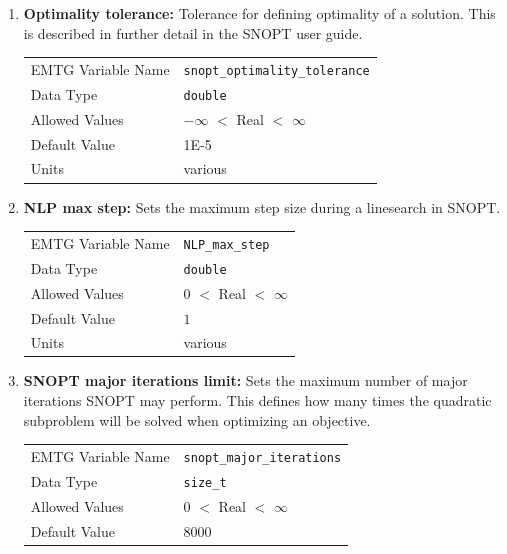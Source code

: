 \begin{enumerate}
    \item \textbf{Optimality tolerance:} Tolerance for defining optimality of a solution. This is described in further detail in the \ac{SNOPT} user guide.
    \begin{table}[H]
        \hspace{2cm}
        \begin{tabular}{lp{5cm}}
        \ac{EMTG} Variable Name & \verb|snopt_optimality_tolerance| \\
        Data Type & \verb|double| \\
        Allowed Values & $-\infty$ $<$ Real $<$ $\infty$ \\
        Default Value & 1E-5 \\
        Units & various
        \end{tabular}
    \end{table}
    
    \item \textbf{\ac{NLP} max step:} Sets the maximum step size during a linesearch in \ac{SNOPT}.
    \begin{table}[H]
        \hspace{2cm}
        \begin{tabular}{lp{5cm}}
        \ac{EMTG} Variable Name & \verb|NLP_max_step| \\
        Data Type & \verb|double| \\
        Allowed Values & $0$ $<$ Real $<$ $\infty$ \\
        Default Value & $1$ \\
        Units & various
        \end{tabular}
    \end{table}
    
    \item \textbf{\ac{SNOPT} major iterations limit:} Sets the maximum number of major iterations \ac{SNOPT} may perform. This defines how many times the quadratic subproblem will be solved when optimizing an objective.
    \begin{table}[H]
        \hspace{2cm}
        \begin{tabular}{lp{5cm}}
        \ac{EMTG} Variable Name & \verb|snopt_major_iterations| \\
        Data Type & \verb|size_t| \\
        Allowed Values & $0$ $<$ Real $<$ $\infty$ \\
        Default Value & $8000$ \\
        \end{tabular}
    \end{table}
    

\end{enumerate}
